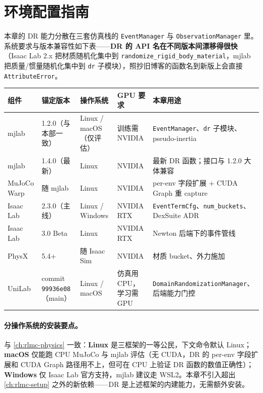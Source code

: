 \section*{环境配置指南}
\label{sec:rlmc-dr-env}

本章的 DR 能力分散在三套仿真栈的 \verb|EventManager| 与 \verb|ObservationManager| 里。系统要求与版本兼容性如下表——\textbf{DR 的 API 名在不同版本间漂移得很快}（Isaac Lab 2.x 把材质随机化集中到 \verb|randomize_rigid_body_material|，mjlab 把质量/惯量随机化集中到 \verb|dr| 子模块），照抄旧博客的函数名到新版上会直接 \verb|AttributeError|。

\begin{center}
\small
\begin{tabular}{@{}lllll@{}}
\toprule
组件 & 锚定版本 & 操作系统 & GPU 要求 & 本章用途 \\
\midrule
mjlab & 1.2.0（与本部一致） & Linux / macOS（仅评估） & 训练需 NVIDIA & \verb|EventManager|、\verb|dr| 子模块、pseudo-inertia \\
mjlab & 1.4.0（最新） & Linux & NVIDIA & 最新 DR 函数；接口与 1.2.0 大体兼容 \\
MuJoCo Warp & 随 mjlab & Linux & NVIDIA & per-env 字段扩展 $+$ CUDA Graph 重 capture \\
Isaac Lab & 2.3.0（主线） & Linux / Windows & NVIDIA RTX & \verb|EventTermCfg|、\verb|num_buckets|、DexSuite ADR \\
Isaac Lab & 3.0 Beta & Linux & NVIDIA RTX & Newton 后端下的事件管线 \\
PhysX & 5.4+ & 随 Isaac Sim & NVIDIA & 材质 bucket、外力施加 \\
UniLab & commit \verb|99936e08|（main） & Linux / macOS & 仿真用 CPU，学习需 GPU & \verb|DomainRandomizationManager|、后端能力门控 \\
\bottomrule
\end{tabular}
\end{center}

\paragraph{分操作系统的安装要点。}与 \cref{ch:rlmc-physics} 一致：\textbf{Linux} 是三框架的一等公民，下文命令默认 Linux；\textbf{macOS} 仅能跑 CPU MuJoCo 与 mjlab 评估（无 CUDA，DR 的 per-env 字段扩展和 CUDA Graph 路径用不上，但可在 CPU 上验证 DR 函数的数值正确性）；\textbf{Windows} 仅 Isaac Lab 官方支持，mjlab 建议走 WSL2。本章不引入超出 \cref{ch:rlmc-setup} 之外的新依赖——DR 是上述框架的内建能力，无需额外安装。

